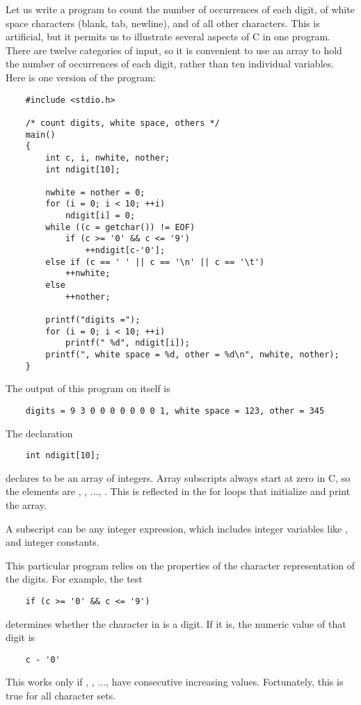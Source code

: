 Let us write a program to count the number of occurrences of each digit, of white space characters (blank, tab, newline), and of all other characters.
This is artificial, but it permits us to illustrate several aspects of C in one program.
There are twelve categories of input, so it is convenient to use an array to hold the number of occurrences of each digit, rather than ten individual variables.
Here is one version of the program:
\begin{lstlisting}
	#include <stdio.h>

	/* count digits, white space, others */
	main()
	{
		int c, i, nwhite, nother;
		int ndigit[10];

		nwhite = nother = 0;
		for (i = 0; i < 10; ++i)
			ndigit[i] = 0;
		while ((c = getchar()) != EOF)
			if (c >= '0' && c <= '9')
				++ndigit[c-'0'];
		else if (c == ' ' || c == '\n' || c == '\t')
			++nwhite;
		else
			++nother;

		printf("digits =");
		for (i = 0; i < 10; ++i)
			printf(" %d", ndigit[i]);
		printf(", white space = %d, other = %d\n", nwhite, nother);
	}
\end{lstlisting}
The output of this program on itself is
\begin{lstlisting}
	digits = 9 3 0 0 0 0 0 0 0 1, white space = 123, other = 345
\end{lstlisting}

The declaration
\begin{lstlisting}
	int ndigit[10];
\end{lstlisting}
declares  to be an array of  integers.
Array subscripts always start at zero in C, so the elements are , , ..., .
This is reflected in the for loops that initialize and print the array.

A subscript can be any integer expression, which includes integer variables like , and integer constants.

This particular program relies on the properties of the character representation of the digits.
For example, the test
\begin{lstlisting}
	if (c >= '0' && c <= '9')
\end{lstlisting}
determines whether the character in  is a digit.
If it is, the numeric value of that digit is
\begin{lstlisting}
	c - '0'
\end{lstlisting}
This works only if , , ...,  have consecutive increasing values.
Fortunately, this is true for all character sets.

